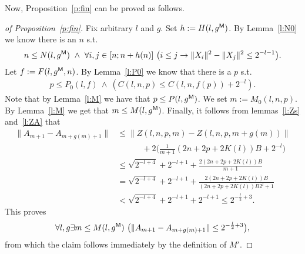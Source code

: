 Now, Proposition~\ref{p:fin} can be proved as follows.

\begin{proof}[ of Proposition~\ref{p:fin}]
Fix arbitrary $l$ and $g$. Set $h:= H(l,g\protect{^{\textsf{\upshape M}}})$.
By Lemma~\ref{l:N0} we know there is an $n$ s.t.  
\[
n\leq N(l,g\powM)\ \wedge\ \forall i,j\in[n;n+h(n)]\ 
\big( i\leq j\rightarrow \|X_i\|^2-\|X_j\|^2\leq 2^{-l-1} \big). %
\]
Let $f:=F(l,g\protect{^{\textsf{\upshape M}}},n)$. By Lemma~\ref{l:P0} we know that there is a $p$ s.t.
\begin{align*}
p\leq P_0(l,f)\ \wedge\ ( C(l,n,p)\leq C(l,n,f(p)) + 2^{-l}  ).  %
\end{align*}
Note that by Lemma~\ref{l:M} we have that $p\leq P(l,g\protect{^{\textsf{\upshape M}}})$. We set $m:=M_0(l,n,p)$. By Lemma~\ref{l:M} we get that $m\leq M(l,g\protect{^{\textsf{\upshape M}}})$.
Finally, it follows from lemmas~\ref{l:Zs} and~\ref{l:ZA} that
\begin{align*}
\|A_{m+1} - A_{m+g(m)+1}\| &\leq \|Z( l,n,p,m ) - Z( l,n,p,m+g(m) )\|\\
		&\quad\quad\quad + 2\Big(\frac{1}{m+1}(2n + 2p + 2K(l))B +2^{-l}\Big)\\
		&\leq \sqrt{2^{-l+4}} + 2^{-l+1} + \frac{2(2n + 2p + 2K(l))B}{m+1} \\
		&= \sqrt{2^{-l+4}} + 2^{-l+1} + \frac{2(2n + 2p + 2K(l))B}{(2n + 2p + 2K(l))B2^{l}+1} \\
		&< \sqrt{2^{-l+4}} + 2^{-l+1} + 2^{-l+1} \leq 2^{-\frac{l}{2}+3}.
\end{align*}
This proves 
\[
\forall l,g \exists m\leq M(l,g\protect{^{\textsf{\upshape M}}})\ \big( \|A_{m+1}-A_{m+g(m)+1}\|\leq 2^{-\frac{l}{2}+3}\big),
\]
from which the claim follows immediately by the definition of $M'$.
\end{proof}
